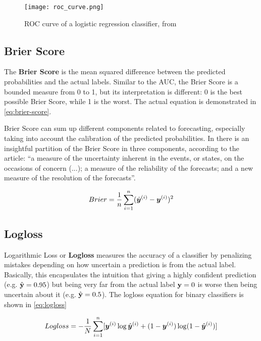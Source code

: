 \begin{figure}[!h]
    \centering
    \texttt{[image: roc\_curve.png]} 
    \caption{ROC curve of a logistic regression classifier, from \cite{kuhn2013applied}}
    \label{fig:auroc}
\end{figure}

\subsection{Brier Score}

The \textbf{Brier Score} is the mean squared difference between the predicted probabilities and the actual labels. Similar to the AUC, the Brier Score is a bounded measure from 0 to 1, but its interpretation is different: 0 is the best possible Brier Score, while 1 is the worst. The actual equation is demonstrated in \ref{eq:brier-score}.

Brier Score can sum up different components related to forecasting, especially taking into account the calibration of the predicted probabilities. In \cite{murphy1973new} there is an insightful partition of the Brier Score in three components, according to the article: ``a measure of the uncertainty inherent in the events, or states, on the occasions of concern (...); a measure of the reliability of the forecasts; and  a new measure of the resolution of the forecasts''.

\begin{equation}\label{eq:brier-score}
    Brier=\frac{1}{n}\sum_{i=1}^{n}(\hat{\bm{y}}^{(i)} - \bm{y}^{(i)})^2
\end{equation}

\subsection{Logloss}

Logarithmic Loss or \textbf{Logloss} measures the accuracy of a classifier by penalizing mistakes depending on how uncertain a prediction is from the actual label. Basically, this encapsulates the intuition that giving a highly confident prediction (e.g. $\hat{\textbf{{\text{\textup{y}}}}} = 0.95$) but being very far from the actual label $\textbf{\text{\textup{y}}} = 0$ is worse then being uncertain about it (e.g.  $\hat{\textbf{{\text{\textup{y}}}}} = 0.5$). The logloss equation for binary classifiers is shown in \ref{eq:logloss}

\begin{equation}\label{eq:logloss}
    Logloss = -\frac{1}{N}\sum_{i=1}^{n}[\bm{y}^{(i)} \log \hat{\bm{y}}^{(i)} + (1 - \bm{y}^{(i)})\log(1 - \hat{\bm{y}}^{(i)})]
\end{equation}




